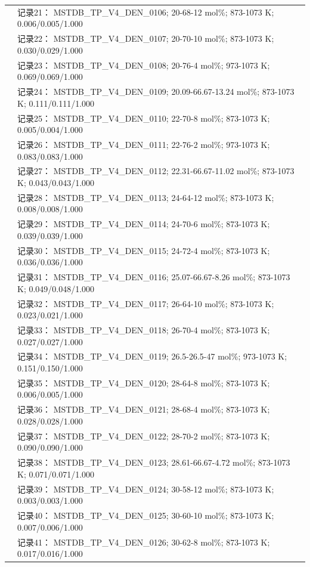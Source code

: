 \documentclass[12pt]{article}
\begin{document}
{\begin{longtable}[]{@{}
  >{\raggedright\arraybackslash}p{}
  >{\raggedright\arraybackslash}p{}@{}}
 & 记录21： MSTDB\_TP\_V4\_DEN\_0106; 20-68-12 mol\%; 873-1073 K; 0.006/0.005/1.000 \\
 & 记录22： MSTDB\_TP\_V4\_DEN\_0107; 20-70-10 mol\%; 873-1073 K; 0.030/0.029/1.000 \\
 & 记录23： MSTDB\_TP\_V4\_DEN\_0108; 20-76-4 mol\%; 973-1073 K; 0.069/0.069/1.000 \\
 & 记录24： MSTDB\_TP\_V4\_DEN\_0109; 20.09-66.67-13.24 mol\%; 873-1073 K; 0.111/0.111/1.000 \\
 & 记录25： MSTDB\_TP\_V4\_DEN\_0110; 22-70-8 mol\%; 873-1073 K; 0.005/0.004/1.000 \\
 & 记录26： MSTDB\_TP\_V4\_DEN\_0111; 22-76-2 mol\%; 973-1073 K; 0.083/0.083/1.000 \\
 & 记录27： MSTDB\_TP\_V4\_DEN\_0112; 22.31-66.67-11.02 mol\%; 873-1073 K; 0.043/0.043/1.000 \\
 & 记录28： MSTDB\_TP\_V4\_DEN\_0113; 24-64-12 mol\%; 873-1073 K; 0.008/0.008/1.000 \\
 & 记录29： MSTDB\_TP\_V4\_DEN\_0114; 24-70-6 mol\%; 873-1073 K; 0.039/0.039/1.000 \\
 & 记录30： MSTDB\_TP\_V4\_DEN\_0115; 24-72-4 mol\%; 873-1073 K; 0.036/0.036/1.000 \\
 & 记录31： MSTDB\_TP\_V4\_DEN\_0116; 25.07-66.67-8.26 mol\%; 873-1073 K; 0.049/0.048/1.000 \\
 & 记录32： MSTDB\_TP\_V4\_DEN\_0117; 26-64-10 mol\%; 873-1073 K; 0.023/0.021/1.000 \\
 & 记录33： MSTDB\_TP\_V4\_DEN\_0118; 26-70-4 mol\%; 873-1073 K; 0.027/0.027/1.000 \\
 & 记录34： MSTDB\_TP\_V4\_DEN\_0119; 26.5-26.5-47 mol\%; 973-1073 K; 0.151/0.150/1.000 \\
 & 记录35： MSTDB\_TP\_V4\_DEN\_0120; 28-64-8 mol\%; 873-1073 K; 0.006/0.005/1.000 \\
 & 记录36： MSTDB\_TP\_V4\_DEN\_0121; 28-68-4 mol\%; 873-1073 K; 0.028/0.028/1.000 \\
 & 记录37： MSTDB\_TP\_V4\_DEN\_0122; 28-70-2 mol\%; 873-1073 K; 0.090/0.090/1.000 \\
 & 记录38： MSTDB\_TP\_V4\_DEN\_0123; 28.61-66.67-4.72 mol\%; 873-1073 K; 0.071/0.071/1.000 \\
 & 记录39： MSTDB\_TP\_V4\_DEN\_0124; 30-58-12 mol\%; 873-1073 K; 0.003/0.003/1.000 \\
 & 记录40： MSTDB\_TP\_V4\_DEN\_0125; 30-60-10 mol\%; 873-1073 K; 0.007/0.006/1.000 \\
 & 记录41： MSTDB\_TP\_V4\_DEN\_0126; 30-62-8 mol\%; 873-1073 K; 0.017/0.016/1.000 \\

\end{longtable}}
\end{document}
